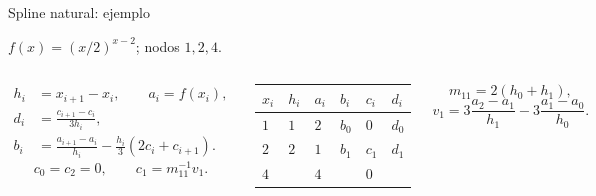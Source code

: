 \documentclass[main.tex]{subfiles}
\begin{document}
\begin{frame}[t]{Spline natural: ejemplo}
\par\noindent\begin{minipage}[t][9mm][t]{\textwidth}\small\strut $f(x)=(x/2)^{x-2}$; nodos $1,2,4$.\end{minipage}\par\nointerlineskip
\begin{columns}[T]\scriptsize\begin{align*}
h_i&=x_{i+1}-x_i,\qquad a_i=f(x_i),\\
d_i&=\frac{c_{i+1}-c_i}{3h_i},\\
b_i&=\frac{a_{i+1}-a_i}{h_i}-\frac{h_i}{3}(2c_i+c_{i+1}).
\end{align*}\scriptsize\[c_0=c_2=0,\qquad c_1=m_{11}^{-1}v_1.\]\begin{minipage}[t]{\textwidth}\begingroup\scriptsize\setlength{\tabcolsep}{2pt}\begin{center}\begin{tabular}{|C{.12\textwidth}|C{.12\textwidth}|C{.12\textwidth}|C{.12\textwidth}|C{.12\textwidth}|C{.12\textwidth}|}\hline
\rule[-2mm]{0pt}{6mm}$x_i$&$h_i$&$a_i$&$b_i$&$c_i$&$d_i$\\\hline
\rule[-2.5mm]{0pt}{7mm}$1$&$1$&$2$&$b_0$&$0$&$d_0$\\\hline
\rule[-2.5mm]{0pt}{7mm}$2$&$2$&$1$&$b_1$&$c_1$&$d_1$\\\hline
\rule[-2.5mm]{0pt}{7mm}$4$&&$4$&&$0$&\\\hline
\end{tabular}\end{center}\endgroup\end{minipage}\par
\scriptsize\[m_{11}=2(h_0+h_1),\]\[v_1=3\frac{a_2-a_1}{h_1}-3\frac{a_1-a_0}{h_0}.\]\end{columns}
\end{frame}
\end{document}
